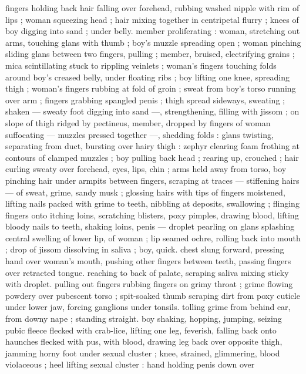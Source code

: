 fingers holding back hair falling over forehead, rubbing washed 
nipple with rim of lips ; woman squeezing head ; hair mixing together 
in centripetal flurry ; knees of boy digging into sand ; under belly. 
member proliferating : woman, stretching out arms, touching glans 
with thumb ; boy's muzzle spreading open ; woman pinching sliding 
glans between two fingers, pulling ; member, bruised, electrifying 
grains ; mica scintillating stuck to rippling veinlets ; woman's fingers 
touching folds around boy's creased belly, under floating ribs ; boy 
lifting one knee, spreading thigh ; woman's fingers rubbing at fold of 
groin ; sweat from boy's torso running over arm ; fingers grabbing 
spangled penis ; thigh spread sideways, sweating ; shaken --- sweaty 
foot digging into sand ---, strengthening, filling with jissom ; on 
slope of thigh ridged by pectineus, member, dropped by fingers of 
woman suffocating --- muzzles pressed together ---, shedding folds 
: glans twisting, separating from duct, bursting over hairy thigh : 
zephyr clearing foam frothing at contours of clamped muzzles ; boy 
pulling back head ; rearing up, crouched ; hair curling sweaty over 
forehead, eyes, lips, chin ; arms held away from torso, boy pinching 
hair under armpits between fingers, scraping at traces --- stiffening 
hairs --- of sweat, grime, sandy musk ; glossing hairs with tips of 
fingers moistened, lifting nails packed with grime to teeth, nibbling 
at deposits, swallowing ; flinging fingers onto itching loins, 
scratching blisters, poxy pimples, drawing blood, lifting bloody nails 
to teeth, shaking loins, penis --- droplet pearling on glans splashing 
central swelling of lower lip, of woman ; lip seamed ochre, rolling 
back into mouth ; drop of jissom dissolving in saliva ; boy, quick. 
chest slung forward, pressing hand over woman's mouth, pushing 
other fingers between teeth, passing fingers over retracted tongue. 
reaching to back of palate, scraping saliva mixing sticky with droplet. 
pulling out fingers rubbing fingers on grimy throat ; grime flowing 
powdery over pubescent torso ; spit-soaked thumb scraping dirt 
from poxy cuticle under lower jaw, forcing ganglions under tonsils. 
tolling grime from behind ear, from downy nape ; standing straight. 
boy shaking, hopping, jumping, seizing pubic fleece flecked with 
crab-lice, lifting one leg, feverish, falling back onto haunches flecked 
with pus, with blood, drawing leg back over opposite thigh, jamming 
horny foot under sexual cluster ; knee, strained, glimmering, blood 
violaceous ; heel lifting sexual cluster : hand holding penis down over 
